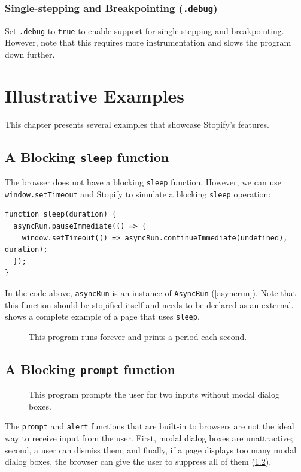 \documentclass[10pt]{book}
\begin{document}
\subsection{Single-stepping and Breakpointing (\texttt{.debug})\label{debug-flag}}

 Set \lstinline|.debug| to \lstinline|true| to enable
support for single-stepping and breakpointing. However, note that this requires
more instrumentation and slows the program down further.

\chapter{Illustrative Examples\label{illustrative-examples}}

\lstset{language=js}
This chapter presents several examples that showcase Stopify's features.

\section{A Blocking \texttt{sleep} function}

The browser does not have a blocking \lstinline|sleep| function.
However, we can use \lstinline|window.setTimeout| and Stopify to simulate
a blocking \lstinline|sleep| operation:
\begin{lstlisting}
function sleep(duration) {
  asyncRun.pauseImmediate(() => {
    window.setTimeout(() => asyncRun.continueImmediate(undefined), duration);
  });
}
\end{lstlisting}

In the code above, \lstinline|asyncRun| is an instance of \lstinline|AsyncRun|
(\cref{asyncrun}). Note that this function should be stopified itself and
needs to be declared as an external.  shows a complete example
of a page that uses \lstinline|sleep|.

\begin{figure}

\caption{This program runs forever and prints a period each second.}
\label{sleep-complete}
\end{figure}

\section{A Blocking \texttt{prompt} function}

\begin{figure}

\caption{This program prompts the user for two inputs without modal dialog boxes.}
\label{prompt-complete}
\end{figure}

The \lstinline|prompt| and \lstinline|alert| functions that are built-in to
browsers are not the ideal way to receive input from the user. First, modal
dialog boxes are unattractive; second, a user can dismiss them; and finally, if
a page displays too many modal dialog boxes, the browser can give the user to
suppress all of them (\cref{prompt-complete}).
\end{document}
